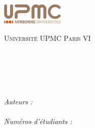 \begin{titlepage}

\begin{center}

\begin{minipage}[t]{0.48\textwidth}
  \begin{flushleft}
    \includegraphics [width=30mm]{figures/url.png} \\[0.5cm]
    \begin{spacing}{1.5}
      \textsc{Université UPMC Paris VI}
    \end{spacing}
  \end{flushleft}
\end{minipage}


\textsc{\Large \reportsubject}\\[0.5cm]
\HRule \\[0.4cm]
{\huge \bfseries \reporttitle}\\[0.4cm]
\HRule \\[1.5cm]

\begin{minipage}[t]{0.3\textwidth}
  \begin{flushleft} \large
    \emph{Auteurs :}\\
    \reportauthor \\
    \emph{Numéros d'étudiants :}
    \numetudiant \\
  \end{flushleft}
\end{minipage}

\vfill


\end{center}

\end{titlepage}